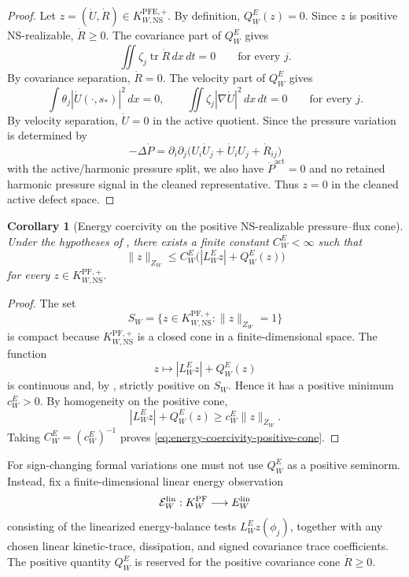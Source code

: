 \documentclass[11pt]{article}
\numberwithin{equation}{section}
\theoremstyle{plain}
\newtheorem{corollary}[theorem]{Corollary}
\theoremstyle{definition}
\theoremstyle{remark}
\newcommand{\NS}{\mathrm{NS}}
\newcommand{\PF}{\mathrm{PF}}
\newcommand{\PFE}{\mathrm{PFE}}
\newcommand{\tr}{\operatorname{tr}}
\newcommand{\act}{\mathrm{act}}
\begin{document}
\begin{proof}
Let \(z=(\dot U,\dot R)\in K^{\PFE,+}_{W,\NS}\).  By definition, \(Q^E_W(z)=0\).  Since \(z\) is positive NS-realizable, \(\dot R\ge0\).  The covariance part of \(Q^E_W\) gives
\[
        \iint\zeta_j\tr\dot R\,dx\,dt=0
        \qquad
        \text{for every }j.
\]
By covariance separation, \(\dot R=0\).  The velocity part of \(Q^E_W\) gives
\[
        \int\theta_j|\dot U(\cdot,s_*)|^2\,dx=0,
        \qquad
        \iint\zeta_j|\nabla\dot U|^2\,dx\,dt=0
        \qquad
        \text{for every }j.
\]
By velocity separation, \(\dot U=0\) in the active quotient.  Since the pressure variation is determined by
\[
        -\Delta\dot P
        =
        \partial_i\partial_j
        \bigl(U_i\dot U_j+\dot U_iU_j+\dot R_{ij}\bigr)
\]
with the active/harmonic pressure split, we also have \(\dot P^{\act}=0\) and no retained harmonic pressure signal in the cleaned representative.  Thus \(z=0\) in the cleaned active defect space.
\end{proof}

\begin{corollary}[Energy coercivity on the positive NS-realizable pressure--flux cone]
\label{cor:energy-coercivity-positive-pf-cone}
Under the hypotheses of , there exists a finite constant \(C^E_W<\infty\) such that
\begin{equation}
        \|z\|_{Z_W}
        \le
        C^E_W
        \bigl(|L^E_Wz|+Q^E_W(z)\bigr)
        \label{eq:energy-coercivity-positive-cone}
\end{equation}
for every \(z\in K^{\PF,+}_{W,\NS}\).
\end{corollary}

\begin{proof}
The set
\[
        S_W=
        \{z\in K^{\PF,+}_{W,\NS}:\|z\|_{Z_W}=1\}
\]
is compact because \(K^{\PF,+}_{W,\NS}\) is a closed cone in a finite-dimensional space.  The function
\[
        z\mapsto |L^E_Wz|+Q^E_W(z)
\]
is continuous and, by , strictly positive on \(S_W\).  Hence it has a positive minimum \(c^E_W>0\).  By homogeneity on the positive cone,
\[
        |L^E_Wz|+Q^E_W(z)
        \ge
        c^E_W\|z\|_{Z_W}.
\]
Taking \(C^E_W=(c^E_W)^{-1}\) proves \eqref{eq:energy-coercivity-positive-cone}.
\end{proof}


For sign-changing formal variations one must not use \(Q^E_W\) as a positive
seminorm.  Instead, fix a finite-dimensional linear energy observation
\[
        \mathcal E^{\rm lin}_W:K^{\PF}_W\longrightarrow E^{\rm lin}_W
\]
consisting of the linearized energy-balance tests \(L^E_Wz(\phi_j)\), together
with any chosen linear kinetic-trace, dissipation, and signed covariance trace
coefficients.  The positive quantity \(Q^E_W\) is reserved for the positive
covariance cone \(\dot R\ge0\).
\end{document}
